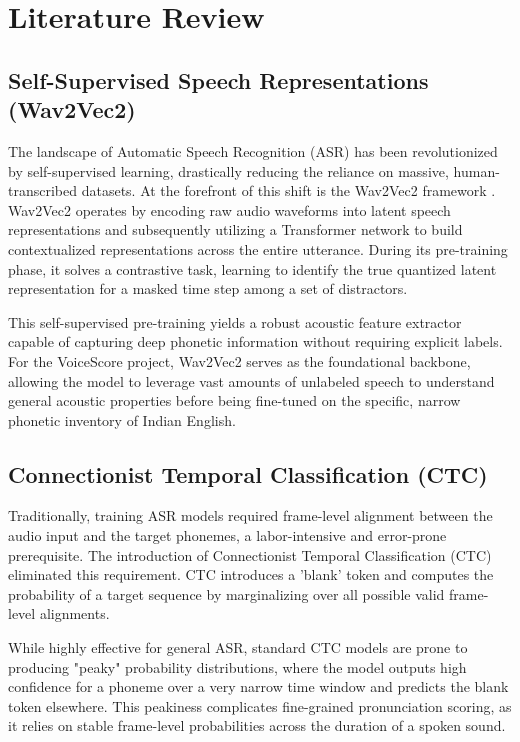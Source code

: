 \chapter{Literature Review}

\section{Self-Supervised Speech Representations (Wav2Vec2)}
The landscape of Automatic Speech Recognition (ASR) has been revolutionized by self-supervised learning, drastically reducing the reliance on massive, human-transcribed datasets. At the forefront of this shift is the Wav2Vec2 framework \cite{baevski2020wav2vec}. Wav2Vec2 operates by encoding raw audio waveforms into latent speech representations and subsequently utilizing a Transformer network to build contextualized representations across the entire utterance. During its pre-training phase, it solves a contrastive task, learning to identify the true quantized latent representation for a masked time step among a set of distractors. 

This self-supervised pre-training yields a robust acoustic feature extractor capable of capturing deep phonetic information without requiring explicit labels. For the VoiceScore project, Wav2Vec2 serves as the foundational backbone, allowing the model to leverage vast amounts of unlabeled speech to understand general acoustic properties before being fine-tuned on the specific, narrow phonetic inventory of Indian English.

\section{Connectionist Temporal Classification (CTC)}
Traditionally, training ASR models required frame-level alignment between the audio input and the target phonemes, a labor-intensive and error-prone prerequisite. The introduction of Connectionist Temporal Classification (CTC) \cite{graves2006connectionist} eliminated this requirement. CTC introduces a 'blank' token and computes the probability of a target sequence by marginalizing over all possible valid frame-level alignments. 

While highly effective for general ASR, standard CTC models are prone to producing "peaky" probability distributions, where the model outputs high confidence for a phoneme over a very narrow time window and predicts the blank token elsewhere. This peakiness complicates fine-grained pronunciation scoring, as it relies on stable frame-level probabilities across the duration of a spoken sound.

